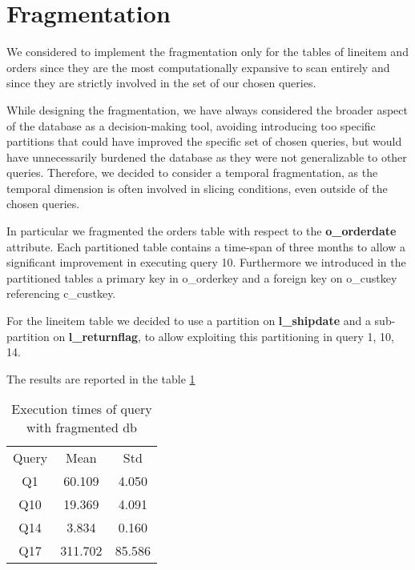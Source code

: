 \section{Fragmentation}
We considered to implement the fragmentation only for the tables of lineitem and orders since they are the most computationally expansive to scan entirely and since they are strictly involved in the set of our chosen queries.

While designing the fragmentation, we have always considered the broader aspect of the database as a decision-making tool, avoiding introducing too specific partitions that could have improved the specific set of chosen queries, but would have unnecessarily burdened the database as they were not generalizable to other queries. Therefore, we decided to consider a temporal fragmentation, as the temporal dimension is often involved in slicing conditions, even outside of the chosen queries. 

In particular we fragmented the orders table with respect to the \textbf{o\_orderdate} attribute. Each partitioned table contains a time-span of three months to allow a significant improvement in executing query 10. Furthermore we introduced in the partitioned tables a primary key in o\_orderkey and a foreign key on o\_custkey referencing c\_custkey.

For the lineitem table we decided to use a partition on \textbf{l\_shipdate} and a sub-partition on \textbf{l\_returnflag}, to allow exploiting this partitioning in query 1, 10, 14.

The results are reported in the table \ref{tab:fragm_exec_time}

\begin{table}[H]
\centering 
\begin{tabular}{c|c|c} 
\rowcolor{blue!50} Query & Mean & Std\\
\rowcolor{gray!10} Q1 &60.109 &4.050\\
\rowcolor{white} Q10 &19.369 &4.091\\
\rowcolor{gray!10} Q14 &3.834 &0.160\\
\rowcolor{white} Q17 &311.702 &85.586\\
\end{tabular}\\[0.5cm] 
\caption{Execution times of query with fragmented db} 
\label{tab:fragm_exec_time} 
\end{table}
